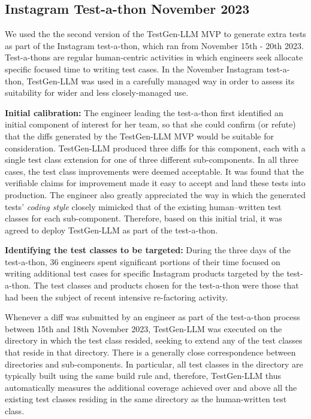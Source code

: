 \documentclass[sigconf,screen]{acmart}
\begin{document}
\subsection{Instagram Test-a-thon November 2023}

We used the the second version of the TestGen-LLM MVP  to generate extra tests as part of the Instagram test-a-thon, 
which ran from November 15th - 20th 2023. 
Test-a-thons are regular human-centric activities in which engineers seek allocate specific focused time to writing test cases.
In the  November Instagram test-a-thon, TestGen-LLM was used in a carefully managed way in order to assess its suitability for wider and less closely-managed use.

\noindent
{\bf 
Initial calibration:} 
The engineer leading the test-a-thon first identified an initial component of interest for her team, 
so that she could  confirm (or refute) that the diffs generated by the TestGen-LLM  MVP would be suitable for consideration. 
TestGen-LLM  produced three diffs for this component, each with a single test class  extension for one of three different sub-components. 
In all three cases, the test class improvements were deemed acceptable.
It was  found that the verifiable claims for improvement made it easy to accept and land these tests into production.
The engineer also greatly appreciated the way in which the generated tests' {\em coding style} closely mimicked that of the existing human–written test classes for each sub-component.
Therefore, based on this initial trial,
it was agreed to deploy TestGen-LLM  as part of the test-a-thon.

\noindent
{\bf 
Identifying the test classes to be targeted:}
During the three days of the test-a-thon, 36 engineers spent significant portions of their time focused on writing additional test cases for specific Instagram products targeted by the test-a-thon.
The test classes and products chosen for the test-a-thon were those that had been the subject of recent intensive re-factoring activity.


Whenever a diff was submitted by an engineer as part of  the test-a-thon process between 15th and 18th November 2023, 
TestGen-LLM was executed on the directory in which the test class resided, 
seeking to extend any of the test classes that reside in that directory.
There is a generally close correspondence between directories and sub-components.
In particular, all test classes in the directory are typically  built using the same  build rule and, therefore, TestGen-LLM thus automatically measures the additional coverage achieved over and above all the existing test classes residing in the same directory as the human-written test class.
\end{document}
